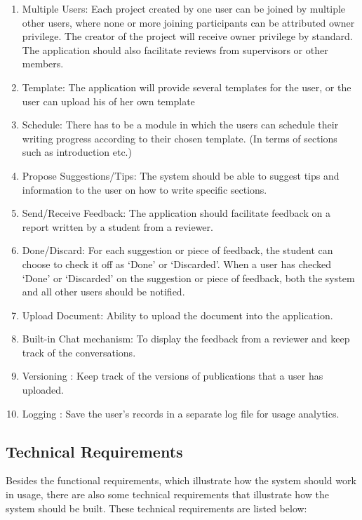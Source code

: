 \begin{enumerate}
	\item Multiple Users: Each project created by one user can be joined by multiple other users, where none or more joining participants can be attributed owner privilege. The creator of the project will receive owner privilege by standard. The application should also facilitate reviews from supervisors or other members.
	\item Template: The application will provide several templates for the user, or the user can upload his of her own template
	\item Schedule: There has to be a module in which the users can schedule their writing progress according to their chosen template. (In terms of sections such as introduction etc.)
	\item Propose Suggestions/Tips: The system should be able to suggest tips and information to the user on how to write specific sections.
	\item Send/Receive Feedback: The application should facilitate feedback on a report written by a student from a reviewer.
	\item Done/Discard: For each suggestion or piece of feedback, the student can choose to check it off as `Done' or `Discarded'. When a user has checked `Done' or `Discarded' on the suggestion or piece of feedback, both the system and all other users should be notified. 
	\item Upload Document: Ability to upload the document into the application.
	\item Built-in Chat mechanism: To display the feedback from a reviewer and keep track of the conversations. 
	\item Versioning : Keep track of the versions of publications that a user has uploaded.
	\item Logging : Save the user's records in a separate log file for usage analytics.
\end{enumerate}

\subsection{Technical Requirements} %
\label{sub:technical_requirements}

Besides the functional requirements, which illustrate how the system should work in usage, there are also some technical requirements that illustrate how the system should be built. These technical requirements are listed below:

